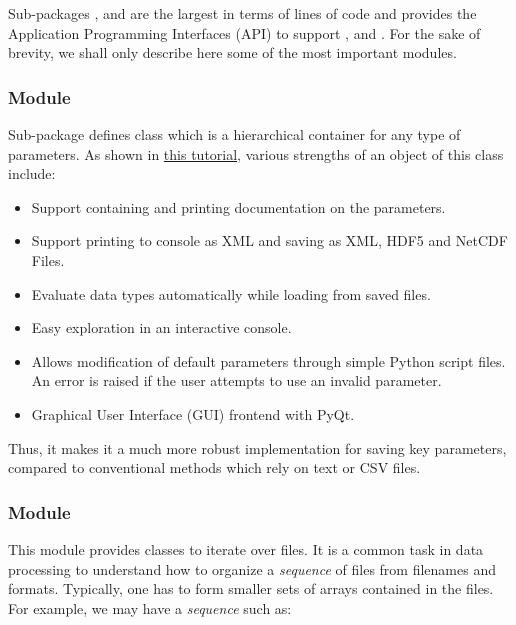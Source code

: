 Sub-packages ,  and  are the
largest in terms of lines of code and provides the Application Programming
Interfaces (API) to support ,  and
.
%
For the sake of brevity, we shall only describe here some of the most important
modules.

\subsubsection*{Module }

Sub-package  defines class
 which is a hierarchical container for any type of
parameters. As shown in
\href{http://fluiddyn.readthedocs.io/en/latest/ipynb/tuto_paramscontainer.html}{%
this tutorial}, various strengths of an object of this class include:
\begin{itemize}
\item Support containing and printing documentation on the parameters.
\item Support printing to console as XML and saving as XML, HDF5 and NetCDF
Files.
\item Evaluate data types automatically while loading from saved files.
\item Easy exploration in an interactive console.
\item Allows modification of default parameters through simple Python script
files. An error is raised if the user attempts to use an invalid parameter.
\item Graphical User Interface (GUI) frontend with PyQt.
\end{itemize}

Thus, it makes it a much more robust implementation for saving key parameters,
compared to conventional methods which rely on text or CSV files.

\subsubsection*{Module }

This module provides classes to iterate over files. It is a common task in data
processing to understand how to organize a \textit{sequence} of files from
filenames and formats. Typically, one has to form smaller sets of arrays
contained in the files. For example, we may have a \textit{sequence} such as:

